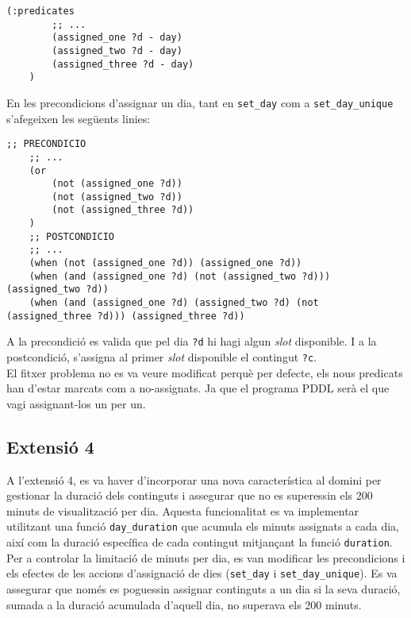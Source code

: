 \documentclass[a4paper]{article}
\begin{document}
	\begin{lstlisting}[language=PDDL, caption={Definició del predicat \texttt{assigned\_<one,two,three>}}, label={lst:predicatassigned123}]
	(:predicates
		;; ...
		(assigned_one ?d - day)
		(assigned_two ?d - day)
		(assigned_three ?d - day)
	)
	\end{lstlisting}
	
	En les precondicions d'assignar un dia, tant en \texttt{set\_day} com a \texttt{set\_day\_unique} s'afegeixen les següents linies:
	
	
	
	\begin{lstlisting}[language=PDDL, caption={Fragment per limitar a 3 els continguts per dia}, label={lst:extensio3}]
	;; PRECONDICIO	
	;; ...
	(or 
		(not (assigned_one ?d))
		(not (assigned_two ?d))
		(not (assigned_three ?d))
	)
	;; POSTCONDICIO
	;; ...
	(when (not (assigned_one ?d)) (assigned_one ?d))
	(when (and (assigned_one ?d) (not (assigned_two ?d))) (assigned_two ?d))
	(when (and (assigned_one ?d) (assigned_two ?d) (not (assigned_three ?d))) (assigned_three ?d))
	\end{lstlisting}
	
	A la precondició es valida que pel dia \texttt{?d} hi hagi algun \textit{slot} disponible. I a la postcondició, s'assigna al primer \textit{slot} disponible el contingut \texttt{?c}. \\
	
	El fitxer problema no es va veure modificat perquè per defecte, els nous predicats han d'estar marcats com a no-assignats. Ja que el programa PDDL serà el que vagi assignant-los un per un.

	\subsection*{Extensió 4}
	
	A l'extensió 4, es va haver d'incorporar una nova característica al domini per gestionar la duració dels continguts i assegurar que no es superessin els 200 minuts de visualització per dia. Aquesta funcionalitat es va implementar utilitzant una funció \texttt{day\_duration} que acumula els minuts assignats a cada dia, així com la duració específica de cada contingut mitjançant la funció \texttt{duration}. \\
	
	Per a controlar la limitació de minuts per dia, es van modificar les precondicions i els efectes de les accions d'assignació de dies (\texttt{set\_day} i \texttt{set\_day\_unique}). Es va assegurar que només es poguessin assignar continguts a un dia si la seva duració, sumada a la duració acumulada d'aquell dia, no superava els 200 minuts.
	
\end{document}
